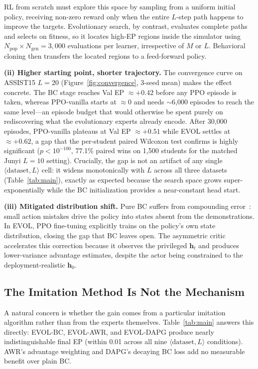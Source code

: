 \documentclass[sigconf,anonymous]{acmart}
\newcommand{\ours}{\textrm{EVOL}}
\begin{document}
RL from scratch must explore this space by sampling from a uniform initial policy, receiving non-zero reward only when the entire $L$-step path happens to improve the targets. Evolutionary search, by contrast, evaluates complete paths and selects on fitness, so it locates high-EP regions inside the simulator using $N_{\text{pop}}\!\times\!N_{\text{gen}}\!=\!3{,}000$ evaluations per learner, irrespective of $M$ or $L$. Behavioral cloning then transfers the located regions to a feed-forward policy.

\textbf{(ii) Higher starting point, shorter trajectory.}
The convergence curve on ASSIST15 $L\!=\!20$ (Figure~\ref{fig:convergence}, 3-seed mean) makes the effect concrete. The BC stage reaches Val EP $\approx +0.42$ before any PPO episode is taken, whereas PPO-vanilla starts at $\approx 0$ and needs $\sim$6{,}000 episodes to reach the same level---an episode budget that would otherwise be spent purely on rediscovering what the evolutionary experts already encode. After 30{,}000 episodes, PPO-vanilla plateaus at Val EP $\approx +0.51$ while \ours{} settles at $\approx +0.62$, a gap that the per-student paired Wilcoxon test confirms is highly significant ($p\!<\!10^{-100}$, 77.1\% paired wins on 1{,}500 students for the matched Junyi $L\!=\!10$ setting). Crucially, the gap is not an artifact of any single $\langle\text{dataset}, L\rangle$ cell: it widens monotonically with $L$ across all three datasets (Table~\ref{tab:main}), exactly as expected because the search space grows super-exponentially while the BC initialization provides a near-constant head start.

\textbf{(iii) Mitigated distribution shift.}
Pure BC suffers from compounding error~\cite{ross2011dagger}: small action mistakes drive the policy into states absent from the demonstrations. In \ours{}, PPO fine-tuning explicitly trains on the policy's own state distribution, closing the gap that BC leaves open. The asymmetric critic accelerates this correction because it observes the privileged $\mathbf{h}_t$ and produces lower-variance advantage estimates, despite the actor being constrained to the deployment-realistic $\mathbf{h}_0$.

\subsection{The Imitation Method Is Not the Mechanism}

A natural concern is whether the gain comes from a particular imitation algorithm rather than from the experts themselves. Table~\ref{tab:main} answers this directly: \ours{}-BC, \ours{}-AWR, and \ours{}-DAPG produce nearly indistinguishable final EP (within 0.01 across all nine $\langle\text{dataset},L\rangle$ conditions). AWR's advantage weighting and DAPG's decaying BC loss add no measurable benefit over plain BC.
\end{document}
